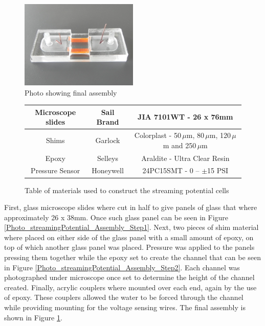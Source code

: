 \begin{figure}[p] \begin{centering}
        \includegraphics[width=0.5\textwidth]{content/pt1/01-PowerHarvesting/graphics/Photo_streamingPotential_Assembly_Step3.JPG}
        \par\end{centering}

\centering{}\protect\caption{\label{Photo_streamingPotential_Assembly_Step3}Photo
    showing final assembly} \end{figure} \begin{figure}
\begin{tabular}{|c|c|c|} \hline Microscope slides & Sail Brand & JIA 7101WT -
    26 x 76mm\tabularnewline \hline Shims & Garlock & Colorplast - 50$\,\mu$m,
    80$\,\mu$m, 120$\,\mu$m and 250$\,\mu$m\tabularnewline \hline Epoxy &
    Selleys & Araldite - Ultra Clear Resin\tabularnewline \hline Pressure
    Sensor & Honeywell & 24PC15SMT - 0 -- $\pm$15 PSI\tabularnewline \hline
\end{tabular}

\protect\caption{\label{Table_StreamingCell_MaterialsUsed}Table of materials
    used to construct the streaming potential cells} \end{figure}


First, glass microscope slides where cut in half to give panels of glass that
where approximately 26 x 38mm. Once such glass panel can be seen in Figure
\ref{Photo_streamingPotential_Assembly_Step1}.  Next, two pieces of shim
material where placed on either side of the glass panel with a small amount of
epoxy, on top of which another glass panel was placed. Pressure was applied to
the panels pressing them together while the epoxy set to create the channel
that can be seen in Figure \ref{Photo_streamingPotential_Assembly_Step2}. Each
channel was photographed under microscope once set to determine the height of
the channel created. Finally, acrylic couplers where mounted over each end,
again by the use of epoxy. These couplers allowed the water to be forced
through the channel while providing mounting for the voltage sensing wires. The
final assembly is shown in Figure
\ref{Photo_streamingPotential_Assembly_Step3}.


